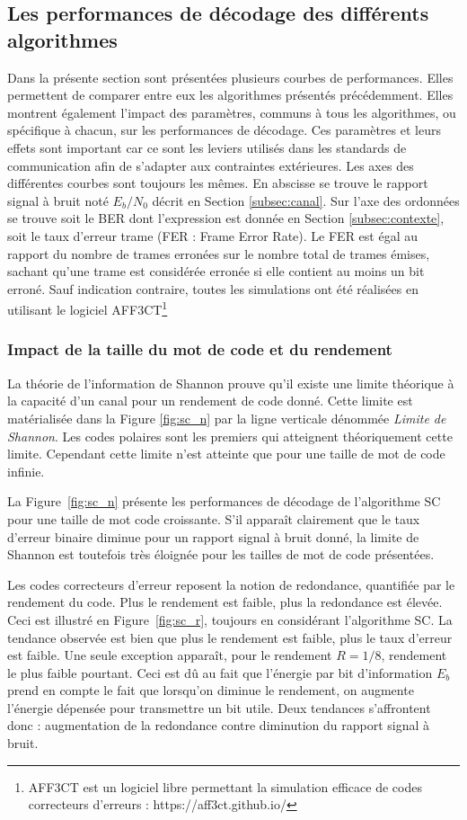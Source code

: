 \subsection{Les performances de décodage des différents algorithmes}
Dans la présente section sont présentées plusieurs courbes de performances. 
Elles permettent de comparer entre eux les algorithmes présentés précédemment.
Elles montrent également l'impact des paramètres, communs à tous les algorithmes, ou spécifique à chacun, sur les performances de décodage.
Ces paramètres et leurs effets sont important car ce sont les leviers utilisés dans les standards de communication afin de s'adapter aux contraintes extérieures.
Les axes des différentes courbes sont toujours les mêmes.
En abscisse se trouve le rapport signal à bruit noté $E_b/N_0$ décrit en Section \ref{subsec:canal}.
Sur l'axe des ordonnées se trouve soit le BER dont l'expression est donnée en Section \ref{subsec:contexte}, soit le taux d'erreur trame (FER : Frame Error Rate). Le FER est égal au rapport du nombre de trames erronées sur le nombre total de trames émises, sachant qu'une trame est considérée erronée si elle contient au moins un bit erroné. Sauf indication contraire, toutes les simulations ont été réalisées en utilisant le logiciel AFF3CT\footnote{AFF3CT est un logiciel libre permettant la simulation efficace de codes correcteurs d'erreurs : https://aff3ct.github.io/}
\subsubsection{Impact de la taille du mot de code et du rendement}

La théorie de l'information de Shannon \cite{shannon_mathematical_2001} prouve qu'il existe une limite théorique à la capacité d'un canal pour un rendement de code donné.
Cette limite est matérialisée dans la Figure \ref{fig:sc_n} par la ligne verticale dénommée \textit{Limite de Shannon}. Les codes polaires sont les premiers qui atteignent théoriquement cette limite. Cependant cette limite n'est atteinte que pour une taille de mot de code infinie.

La Figure~\ref{fig:sc_n} présente les performances de décodage de l'algorithme SC pour une taille de mot code croissante. S'il apparaît clairement que le taux d'erreur binaire diminue pour un rapport signal à bruit donné, la limite de Shannon est toutefois très éloignée pour les tailles de mot de code présentées. 

Les codes correcteurs d'erreur reposent la notion de redondance, quantifiée par le rendement du code. Plus le rendement est faible, plus la redondance est élevée.
Ceci est illustré en Figure~\ref{fig:sc_r}, toujours en considérant l'algorithme SC. La tendance observée est bien que plus le rendement est faible, plus le taux d'erreur est faible.
Une seule exception apparaît, pour le rendement $R=1/8$, rendement le plus faible pourtant. Ceci est dû au fait que l'énergie par bit d'information $E_b$ prend en compte le fait que lorsqu'on diminue le rendement, on augmente l'énergie dépensée pour transmettre un bit utile. Deux tendances s'affrontent donc : augmentation de la redondance contre diminution du rapport signal à bruit.

